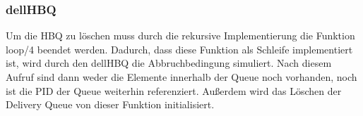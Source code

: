 \subsubsection{dellHBQ}

Um die HBQ zu löschen muss durch die rekursive Implementierung die Funktion loop/4 beendet werden. Dadurch, dass diese Funktion als Schleife implementiert ist, wird durch den dellHBQ die Abbruchbedingung simuliert. Nach diesem Aufruf sind dann weder die Elemente innerhalb der Queue noch vorhanden, noch ist die PID der Queue weiterhin referenziert. 
Außerdem wird das Löschen der Delivery Queue von dieser Funktion initialisiert. 

